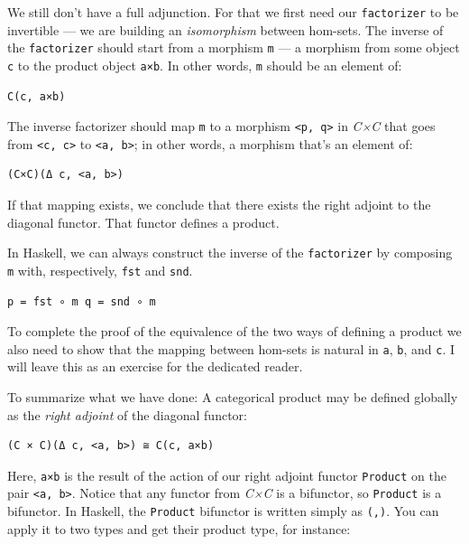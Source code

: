 We still don't have a full adjunction. For that we first need our
\texttt{factorizer} to be invertible --- we are building an
\emph{isomorphism} between hom-sets. The inverse of the
\texttt{factorizer} should start from a morphism \texttt{m} --- a
morphism from some object \texttt{c} to the product object \texttt{a×b}.
In other words, \texttt{m} should be an element of:

\begin{verbatim}
C(c, a×b)
\end{verbatim}

The inverse factorizer should map \texttt{m} to a morphism
\texttt{\textless{}p,\ q\textgreater{}} in \emph{C×C} that goes from
\texttt{\textless{}c,\ c\textgreater{}} to
\texttt{\textless{}a,\ b\textgreater{}}; in other words, a morphism
that's an element of:

\begin{verbatim}
(C×C)(Δ c, <a, b>)
\end{verbatim}

If that mapping exists, we conclude that there exists the right adjoint
to the diagonal functor. That functor defines a product.

In Haskell, we can always construct the inverse of the
\texttt{factorizer} by composing \texttt{m} with, respectively,
\texttt{fst} and \texttt{snd}.

\begin{verbatim}
p = fst ∘ m q = snd ∘ m
\end{verbatim}

To complete the proof of the equivalence of the two ways of defining a
product we also need to show that the mapping between hom-sets is
natural in \texttt{a}, \texttt{b}, and \texttt{c}. I will leave this as
an exercise for the dedicated reader.

To summarize what we have done: A categorical product may be defined
globally as the \emph{right adjoint} of the diagonal functor:

\begin{verbatim}
(C × C)(Δ c, <a, b>) ≅ C(c, a×b)
\end{verbatim}

Here, \texttt{a×b} is the result of the action of our right adjoint
functor \texttt{Product} on the pair
\texttt{\textless{}a,\ b\textgreater{}}. Notice that any functor from
\emph{C×C} is a bifunctor, so \texttt{Product} is a bifunctor. In
Haskell, the \texttt{Product} bifunctor is written simply as
\texttt{(,)}. You can apply it to two types and get their product type,
for instance:

